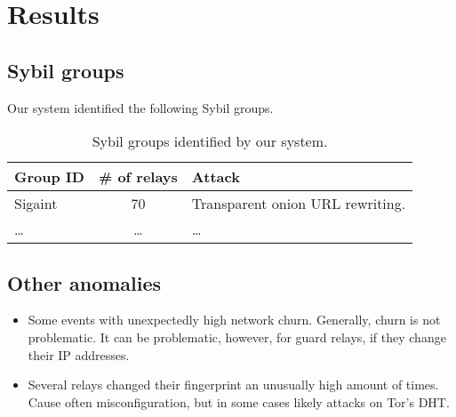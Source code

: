 \section{Results}
\label{sec:results}

\subsection{Sybil groups}
Our system identified the following Sybil groups.

\begin{table}[ht]
\centering
\begin{tabular}{l c p{4cm}}
\textbf{Group ID} & \textbf{\# of relays} & \textbf{Attack} \\
\hline
Sigaint & 70 & Transparent onion URL rewriting. \\
\ldots & \ldots & \ldots \\
\end{tabular}
\caption{Sybil groups identified by our system.}
\label{bar}
\end{table}

\subsection{Other anomalies}
\begin{itemize}
	\item Some events with unexpectedly high network churn.  Generally, churn
		is not problematic.  It can be problematic, however, for guard relays,
		if they change their IP addresses.

	\item Several relays changed their fingerprint an unusually high amount of
		times.  Cause often misconfiguration, but in some cases likely attacks
		on Tor's DHT.
\end{itemize}
